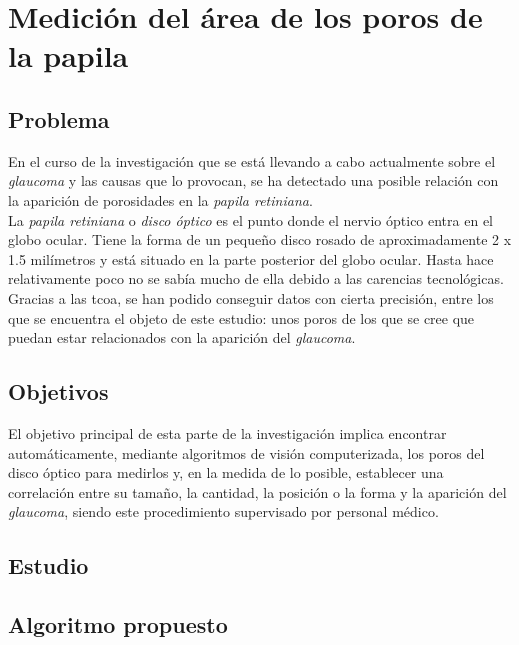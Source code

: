 \chapter{Medición del área de los poros de la papila}
\section{Problema}
En el curso de la investigación que se está llevando
a cabo actualmente sobre el \emph{glaucoma} y las
causas que lo provocan, se ha detectado
una posible relación con la aparición de porosidades
en la \emph{papila retiniana}. \\
La \emph{papila retiniana} o \emph{disco óptico} 
es el punto donde el nervio óptico entra en el globo 
ocular. Tiene la forma de un pequeño disco rosado de 
aproximadamente 2 x 1.5 milímetros y está situado en 
la parte posterior del globo ocular. Hasta hace 
relativamente poco no se sabía mucho de ella debido 
a las carencias tecnológicas. Gracias a las \gls{tcoa},
se han podido conseguir datos con cierta precisión, 
entre los que se encuentra el objeto de este estudio:
unos poros de los que se cree que puedan estar 
relacionados con la aparición del \emph{glaucoma}.\\

\section{Objetivos}
El objetivo principal de esta parte de la investigación 
implica encontrar automáticamente, mediante algoritmos 
de visión computerizada, los poros del disco óptico
para medirlos y, en la medida de lo posible, establecer
una correlación entre su tamaño, la cantidad, la posición
o la forma y la aparición del \emph{glaucoma}, siendo
este procedimiento supervisado por personal médico.

\section{Estudio}
\section{Algoritmo propuesto}
